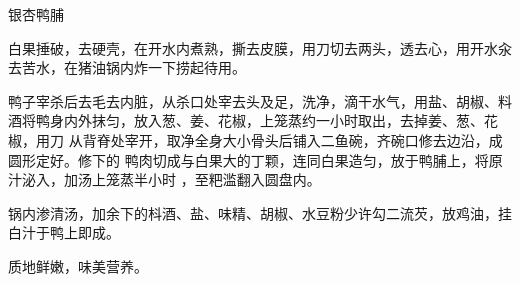 \begin{recipe}{银杏鸭脯}

\ingredients



\preparation

\step 白果捶破，去硬壳，在开水内煮熟，撕去皮膜，用刀切去两头，透去心，用开水汆
去苦水，在猪油锅内炸一下捞起待用。

\step 鸭子宰杀后去毛去内脏，从杀口处宰去头及足，洗净，滴干水气，用盐、胡椒、料
酒将鸭身内外抹匀，放入葱、姜、花椒，上笼蒸约一小时取出，去掉姜、葱、花椒，用刀
从背脊处宰开，取净全身大小骨头后铺入二鱼碗，齐碗口修去边沿，成圆形定好。修下的
鸭肉切成与白果大的丁颗，连同白果造匀，放于鸭脯上，将原汁泌入，加汤上笼蒸半小时
，至粑滥翻入圆盘内。

\step 锅内渗清汤，加余下的枓酒、盐、味精、胡椒、水豆粉少许勾二流芡，放鸡油，挂
白汁于鸭上即成。

\features

质地鲜嫩，味美营养。

\end{recipe}

